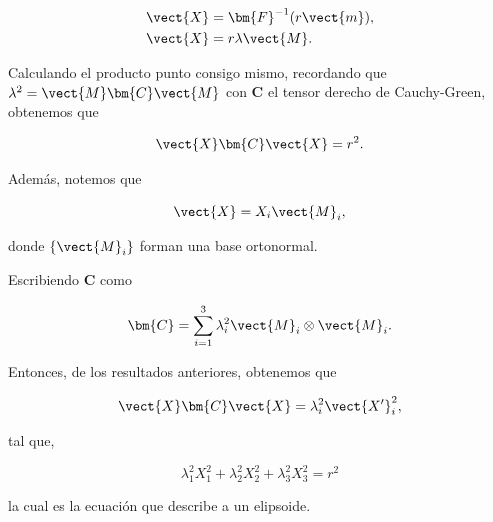 \documentclass[../main.tex]{subfiles}
\begin{document}
\begin{problema}[3]
	\begin{align*}
		\vect{X} & = \bm{F}^{-1}(r \vect{m}), \\
		\vect{X} & = r\lambda \vect{M}.
	\end{align*}

	Calculando el producto punto consigo mismo, recordando que \(\lambda^{2} = \vect{M} \bm{C}\vect{M}\) con
	\(\bm{C}\) el tensor derecho de Cauchy-Green, obtenemos que

	\begin{equation*}
		\vect{X}\bm{C}\vect{X} = r^{2}.
	\end{equation*}

	Además, notemos que

	\begin{equation*}
		\vect{X} = X_{i}\vect{M}_{i},
	\end{equation*}

	donde \(\{\vect{M}_{i}\}\) forman una base ortonormal.

	Escribiendo \(\bm{C}\) como

	\begin{equation*}
		\bm{C} = \sum_{i = 1}^{3}\lambda_{i}^{2} \vect{M}_{i} \otimes \vect{M}_{i}.
	\end{equation*}

	Entonces, de los resultados anteriores, obtenemos que

	\begin{equation*}
		\vect{X} \bm{C}\vect{X} = \lambda_{i}^{2}\vect{X^{\prime}}_{i}^{2},
	\end{equation*}

	tal que,

	\begin{equation*}
		\lambda_{1}^{2}X_{1}^{2} + \lambda_{2}^{2}X_{2}^{2} + \lambda_{3}^{2}X_{3}^{2} = r^{2}
	\end{equation*}

	la cual es la ecuación que describe a un elipsoide.
\end{problema}
\end{document}

